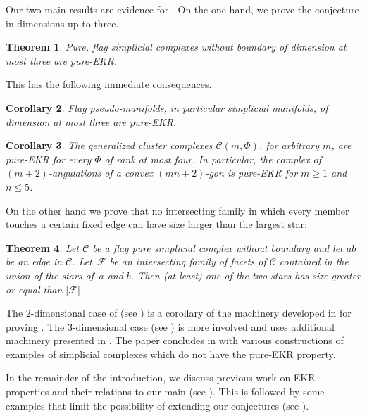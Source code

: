 \documentclass[a4paper,12pt]{amsart}
\theoremstyle{plain}
\newtheorem{theorem}{Theorem}[section]
\newtheorem{corollary}[theorem]{Corollary}
\theoremstyle{definition}
\newcommand{\C}{\mathcal C}
\newcommand{\family}{\mathcal F}
\begin{document}
Our two main results are evidence for . On the one hand, we prove the conjecture in dimensions up to three. 

\begin{theorem}
\label{thm:main}
  Pure, flag simplicial complexes without boundary of dimension at most three are pure-EKR.
\end{theorem}

This has the following immediate consequences.

\begin{corollary}
  Flag pseudo-manifolds, in particular simplicial manifolds, of dimension at most three are pure-EKR.
\end{corollary}

\begin{corollary}
  The generalized cluster complexes $\C(m, \Phi)$, for arbitrary $m$, are pure-EKR for every $\Phi$ of rank at most four.
    In particular, the complex of $(m+2)$-angulations of a convex $(mn+2)$-gon is pure-EKR for $m \geq 1$ and $n \leq 5$.
\end{corollary}


On the other hand we prove that no intersecting family in which every member touches a certain fixed edge can have size larger than the largest star:

\begin{theorem}
\label{thm:main2}
Let $\C$ be a flag pure simplicial complex without boundary and let $ab$ be an edge in $\C$.
Let~$\family$ be an intersecting family of facets of $\C$ contained in the union of the stars of~$a$ and $b$.
Then (at least) one of the two stars has size greater or equal than $|\family|$.
\end{theorem}

The $2$-dimensional case of  (see ) is a corollary of the machinery developed in  for proving .
The $3$-dimensional case (see ) is more involved and uses additional machinery presented in .
The paper concludes in  with 
various constructions of examples of simplicial complexes which do not have the pure-EKR property.

\medskip

In the remainder of the introduction, we discuss previous work on EKR-properties and their relations to our main  (see ).
This is followed by some examples that limit the possibility of extending our conjectures (see ).
\end{document}
